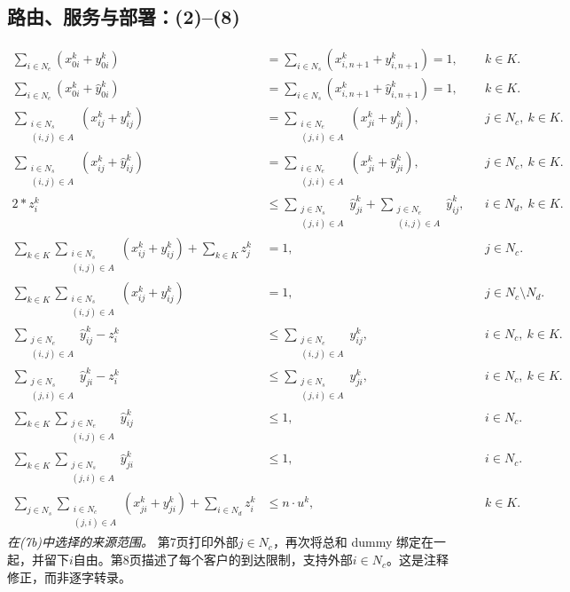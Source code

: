 \documentclass[10pt]{article}
\begin{document}
\subsection*{路由、服务与部署：(2)–(8)}
\begin{align}
\sum_{i\in N_e}(x_{0i}^k+y_{0i}^k)
&=\sum_{i\in N_s}(x_{i,n+1}^k+y_{i,n+1}^k)=1,
&&k\in K.\tag{2a}\\
\sum_{i\in N_e}(x_{0i}^k+\hat y_{0i}^k)
&=\sum_{i\in N_s}(x_{i,n+1}^k+\hat y_{i,n+1}^k)=1,
&&k\in K.\tag{2b}\\
\sum_{\substack{i\in N_s\\(i,j)\in A}}(x_{ij}^k+y_{ij}^k)
&=\sum_{\substack{i\in N_e\\(j,i)\in A}}(x_{ji}^k+y_{ji}^k),
&&j\in N_c,\ k\in K.\tag{3a}\\
\sum_{\substack{i\in N_s\\(i,j)\in A}}(x_{ij}^k+\hat y_{ij}^k)
&=\sum_{\substack{i\in N_e\\(j,i)\in A}}(x_{ji}^k+\hat y_{ji}^k),
&&j\in N_c,\ k\in K.\tag{3b}\\
2*z_i^k&\leq\sum_{\substack{j\in N_s\\(j,i)\in A}}\hat y_{ji}^k+\sum_{\substack{j\in N_e\\(i,j)\in A}}\hat y_{ij}^k,
&&i\in N_d,\ k\in K.\tag{4}\\
\sum_{k\in K}\sum_{\substack{i\in N_s\\(i,j)\in A}}(x_{ij}^k+y_{ij}^k)+\sum_{k\in K}z_j^k&=1,
&&j\in N_c.\tag{5a}\\
\sum_{k\in K}\sum_{\substack{i\in N_s\\(i,j)\in A}}(x_{ij}^k+y_{ij}^k)&=1,
&&j\in N_c\setminus N_d.\tag{5b}\\
\sum_{\substack{j\in N_e\\(i,j)\in A}}\hat y_{ij}^k-z_i^k&\leq\sum_{\substack{j\in N_e\\(i,j)\in A}}y_{ij}^k,
&&i\in N_c,\ k\in K.\tag{6a}\\
\sum_{\substack{j\in N_s\\(j,i)\in A}}\hat y_{ji}^k-z_i^k&\leq\sum_{\substack{j\in N_s\\(j,i)\in A}}y_{ji}^k,
&&i\in N_c,\ k\in K.\tag{6b}\\
\sum_{k\in K}\sum_{\substack{j\in N_e\\(i,j)\in A}}\hat y_{ij}^k&\leq1,
&&i\in N_c.\tag{7a}\\
\sum_{k\in K}\sum_{\substack{j\in N_s\\(j,i)\in A}}\hat y_{ji}^k&\leq1,
&&i\in N_c.\tag{7b}\\
\sum_{j\in N_s}\sum_{\substack{i\in N_c\\(j,i)\in A}}(x_{ji}^k+y_{ji}^k)+\sum_{i\in N_d}z_i^k&\leq n\cdot u^k,
&&k\in K.\tag{8}
\end{align}
\noindent\emph{在(7b)中选择的来源范围。}
第7页打印外部$j\in N_c$，再次将总和 dummy 绑定在一起，并留下$i$自由。第8页描述了每个客户的到达限制，支持外部$i\in N_c$。这是注释修正，而非逐字转录。
\end{document}
